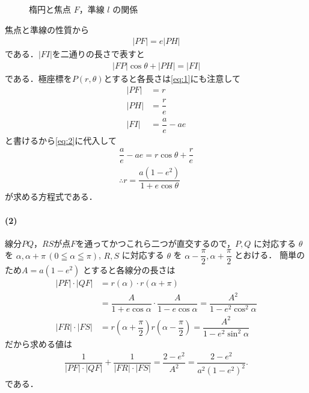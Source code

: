 \documentclass[../../main.tex]{subfiles}
\begin{document}
\begin{figure}[htb]
\begin{center}
    \caption{楕円と焦点 $F$，準線 $l$ の関係}
  \end{center}
\end{figure}

焦点と準線の性質から
\begin{align}
  |PF| = e |PH| \label{eq:1}
\end{align}
である．$|FI|$を二通りの長さで表すと
\begin{align}
  |FP|\cos\theta + |PH| = |FI| \label{eq:2}
\end{align}
である．極座標を$P(r,\theta)$とすると各長さは\cref{eq:1}にも注意して
\begin{align}
  |PF| &= r \\
  |PH| &= \dfrac{r}{e} \\
  |FI| &= \dfrac{a}{e} - ae
\end{align}
と書けるから\cref{eq:2}に代入して
\begin{align}
  \dfrac{a}{e} - ae = r \cos \theta + \dfrac{r}{e} \\
  \therefore
  r = \dfrac{a(1-e^2)}{1+e\cos\theta}
\end{align}
が求める方程式である．

\paragraph{(2)}
線分$PQ$，$RS$が点$F$を通ってかつこれら二つが直交するので，$P, Q$ に対応する $\theta$ を $\alpha, \alpha+\pi \, (0 \leqq \alpha \leqq \pi)$, $R, S$ に対応する $\theta$ を $\alpha-\dfrac{\pi}{2}, \alpha+\dfrac{\pi}{2}$ とおける．
簡単のため$A = a(1-e^2)$ とすると各線分の長さは
\begin{align}
  |PF| \cdot |QF| &= r(\alpha) \cdot r(\alpha+\pi) \\
  &= \dfrac{A}{1+e\cos\alpha} \cdot \dfrac{A}{1-e\cos\alpha} = \dfrac{A^2}{1-e^2\cos^2\alpha} \\
  |FR| \cdot |FS| &= r\left(\alpha+\dfrac{\pi}{2}\right) r\left(\alpha-\dfrac{\pi}{2}\right) = \dfrac{A^2}{1-e^2\sin^2\alpha}
\end{align}
だから求める値は
\begin{align}
  \dfrac{1}{|PF|\cdot|QF|} + \dfrac{1}{|FR|\cdot|FS|} = \dfrac{2-e^2}{A^2} = \dfrac{2-e^2}{a^2(1-e^2)^2}.
\end{align}
である．
\end{document}
